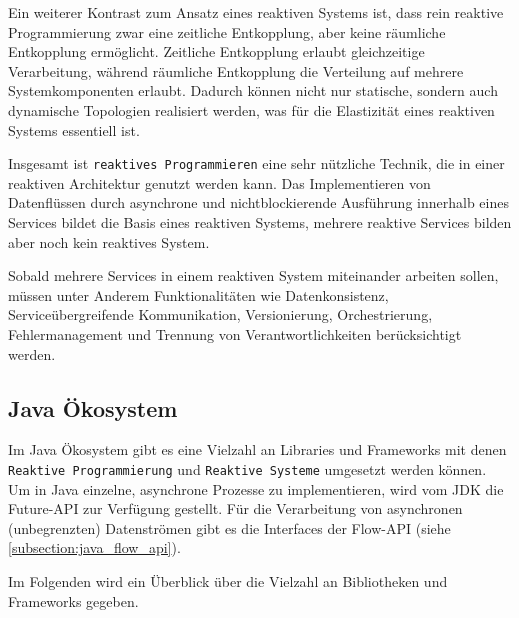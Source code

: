 Ein weiterer Kontrast zum Ansatz eines reaktiven Systems ist, dass rein reaktive Programmierung zwar eine zeitliche Entkopplung,
aber keine räumliche Entkopplung ermöglicht. Zeitliche Entkopplung erlaubt gleichzeitige Verarbeitung, während räumliche Entkopplung
die Verteilung auf mehrere Systemkomponenten erlaubt. Dadurch können nicht nur statische, sondern auch dynamische Topologien
realisiert werden, was für die Elastizität eines reaktiven Systems essentiell ist.

Insgesamt ist \verb|reaktives Programmieren| eine sehr nützliche Technik, die in einer reaktiven Architektur genutzt werden kann.
Das Implementieren von Datenflüssen durch asynchrone und nichtblockierende Ausführung innerhalb eines Services bildet
die Basis eines reaktiven Systems, mehrere reaktive Services bilden aber noch kein reaktives System.

Sobald mehrere Services in einem reaktiven System miteinander arbeiten sollen, müssen unter Anderem Funktionalitäten wie
Datenkonsistenz, Serviceübergreifende Kommunikation, Versionierung, Orchestrierung, Fehlermanagement und Trennung von Verantwortlichkeiten
berücksichtigt werden.

\subsection{Java Ökosystem}
\label{subsec:java_ökosystem}
Im Java Ökosystem gibt es eine Vielzahl an Libraries und Frameworks mit denen
\verb|Reaktive Programmierung| und \verb|Reaktive Systeme| umgesetzt werden können.
Um in Java einzelne, asynchrone Prozesse zu implementieren, wird vom JDK die Future-API zur Verfügung gestellt.\parencite{OracleFuture}
Für die Verarbeitung von asynchronen (unbegrenzten) Datenströmen gibt es die Interfaces der Flow-API (siehe \ref{subsection:java_flow_api}).
\parencite{OracleFlow}

Im Folgenden wird ein Überblick über die Vielzahl an Bibliotheken und Frameworks gegeben.

